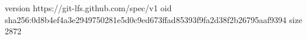 version https://git-lfs.github.com/spec/v1
oid sha256:0d8b4ef4a3e2949750281e5d0c9ed673ffad85393f9fa2d38f2b26795aaf9394
size 2872
